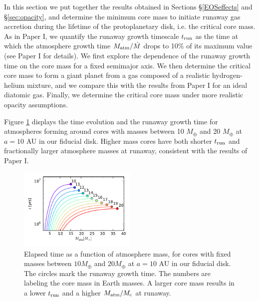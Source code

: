 \documentclass[apj]{emulateapj}
\newcommand{\co}{_{\rm c}}
\begin{document}


In this section we put together the results obtained in Sections \S\ref{EOSeffects}  and \S\ref{sec:opacity}, and determine the minimum core mass to initiate runaway gas accretion during the lifetime of the protoplanetary disk, i.e. the critical core mass. As in Paper I, we quantify the runaway growth timescale $t_{\rm run}$ as the time at which the atmosphere growth time $M_{\rm atm}/\dot{M}$ drops to 10\% of its maximum value (see Paper I for details). We first explore the dependence of the runaway growth time on the core mass for a fixed semimajor axis. We then determine the critical core mass to form a giant planet from a gas composed of a realistic hydrogen-helium mixture, and we compare this with the results from Paper I for an ideal diatomic gas. Finally, we determine the critical core mass under more realistic opacity assumptions.



Figure \ref{fig:tvsMplot} displays the time evolution and the runaway growth time for atmospheres forming around cores with masses between 10 $M_{\oplus}$ and 20 $M_{\oplus}$ at $a=10$ AU in our fiducial disk. Higher mass cores have both shorter $t_{\rm run}$ and fractionally larger atmosphere masses at runaway, consistent with the results of Paper I. 

\begin{figure}[h!]
\centering
\includegraphics[width=0.5\textwidth]{../../figs/ModelAtmospheres/RadSelfGravRealEOS/PaperFigs/t_vs_M_10au.pdf}
\caption{Elapsed time as a function of atmosphere mass, for cores with fixed masses between $10 M_{\oplus}$ and $20 M_{\oplus}$ at $a=10$ AU in our fiducial disk. The circles mark the runaway growth time. The numbers are labeling the core mass in Earth masses. A larger core mass results in a lower $t_{\rm run}$ and a higher $M_{\rm atm}/M\co$ at runaway.}
\label{fig:tvsMplot}
\end{figure}
\end{document}
